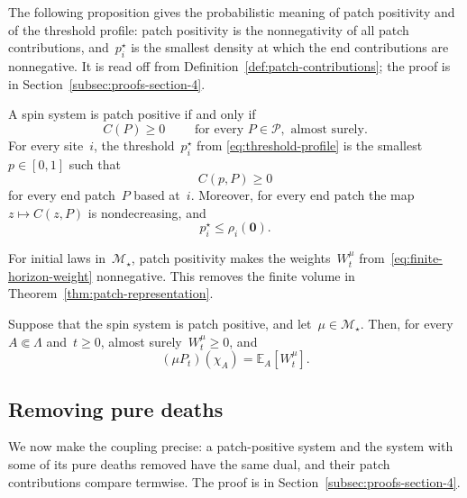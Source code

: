 \documentclass[EJP,preprint,NODS,nobera]{ejpecp}
\newcommand{\E}{\mathbb{E}}
\newcommand{\Cb}[1]{\left[#1\right]}
\newcommand{\mb}[1]{\mathbf{#1}}
\newcommand{\chg}[1]{{\color{changegreen}#1}}
\begin{document}
\chg{The following proposition gives the probabilistic meaning of patch
positivity and of the threshold profile: patch positivity is the
nonnegativity of all patch contributions, and~$p_i^\star$ is the smallest
density at which the end contributions are nonnegative. It is read off from
Definition~\ref{def:patch-contributions}; the proof is in
Section~\ref{subsec:proofs-section-4}.}

\begin{proposition}
\label{prop:patch-contribution-positivity}
A spin system is patch positive if and only if
\begin{equation*}
C(P)\geq0 \qquad \text{ for every }P\in\mathcal{P}, \text{ almost surely.}
\end{equation*}
For every site~$i$, the threshold~$p_i^\star$ from
\eqref{eq:threshold-profile} is the smallest~$p\in[0,1]$ such that
\begin{equation*}
C(p,P)\geq0
\end{equation*}
for every end patch~$P$ based at~$i$. Moreover, for every end patch the map~$z\mapsto C(z,P)$ is nondecreasing, and
\begin{equation}
\label{eq:threshold-below-zero-neighbour-refresh}
p_i^\star\leq\rho_i(\mb 0).
\end{equation}
\end{proposition}

\chg{For initial laws in~$\mathcal M_\star$, patch positivity makes the
weights~$W_t^\mu$ from~\eqref{eq:finite-horizon-weight} nonnegative. This
removes the finite volume in Theorem~\ref{thm:patch-representation}.}

\chg{\begin{corollary}
\label{cor:infinite-volume-representation}
Suppose that the spin system is patch positive, and let~$\mu\in\mathcal M_\star$.
Then, for every~$A\Subset\Lambda$ and~$t\geq0$, almost surely~$W_t^\mu\geq0$, and
\begin{equation}
\label{eq:infinite-volume-representation}
(\mu P_t)(\chi_A)
=
\E_A\Cb{W_t^\mu}.
\end{equation}
\end{corollary}}

\subsection{Removing pure deaths}
\label{subsec:proof-pure-death-comparison}

\chg{We now make the coupling precise: a patch-positive system and the system
with some of its pure deaths removed have the same dual, and their patch
contributions compare termwise. The proof is in
Section~\ref{subsec:proofs-section-4}.}
\end{document}
